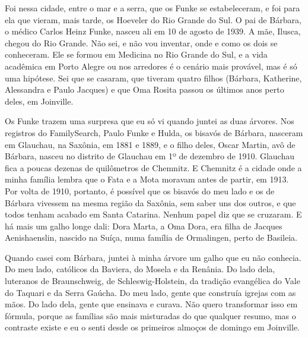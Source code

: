 \documentclass[
  brazilian,
  11pt,
  openany]{book}
\begin{document}
Foi nessa cidade, entre o mar e a serra, que os Funke se estabeleceram,
e foi para ela que vieram, mais tarde, os Hoeveler do Rio Grande do Sul.
O pai de Bárbara, o médico Carlos Heinz Funke, nasceu ali em 10 de
agosto de 1939. A mãe, Ilusca, chegou do Rio Grande. Não sei, e não vou
inventar, onde e como os dois se conheceram. Ele se formou em Medicina
no Rio Grande do Sul, e a vida acadêmica em Porto Alegre ou nos
arredores é o cenário mais provável, mas é só uma hipótese. Sei que se
casaram, que tiveram quatro filhos (Bárbara, Katherine, Alessandra e
Paulo Jacques) e que Oma Rosita passou os últimos anos perto deles, em
Joinville.

Os Funke trazem uma surpresa que eu só vi quando juntei as duas árvores.
Nos registros do FamilySearch, Paulo Funke e Hulda, os bisavós de
Bárbara, nasceram em Glauchau, na Saxônia, em 1881 e 1889, e o filho
deles, Oscar Martin, avô de Bárbara, nasceu no distrito de Glauchau em
1º de dezembro de 1910. Glauchau fica a poucas dezenas de quilômetros de
Chemnitz. E Chemnitz é a cidade onde a minha família lembra que o Fata e
a Mota moravam antes de partir, em 1913. Por volta de 1910, portanto, é
possível que os bisavós do meu lado e os de Bárbara vivessem na mesma
região da Saxônia, sem saber uns dos outros, e que todos tenham acabado
em Santa Catarina. Nenhum papel diz que se cruzaram. E há mais um galho
longe dali: Dora Marta, a Oma Dora, era filha de Jacques Aenishaenslin,
nascido na Suíça, numa família de Ormalingen, perto de Basileia.

Quando casei com Bárbara, juntei à minha árvore um galho que eu não
conhecia. Do meu lado, católicos da Baviera, do Mosela e da Renânia. Do
lado dela, luteranos de Braunschweig, de Schleswig-Holstein, da tradição
evangélica do Vale do Taquari e da Serra Gaúcha. Do meu lado, gente que
construía igrejas com as mãos. Do lado dela, gente que ensinava e
curava. Não quero transformar isso em fórmula, porque as famílias são
mais misturadas do que qualquer resumo, mas o contraste existe e eu o
senti desde os primeiros almoços de domingo em Joinville.
\end{document}
